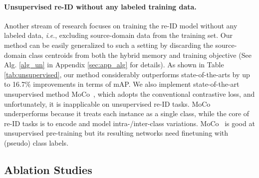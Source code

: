 \documentclass{article}
\newcommand{\ie}{\textit{i}.\textit{e}., }
\begin{document}
\paragraph{Unsupervised re-ID without any labeled training data.}

Another stream of research focuses on training the re-ID model without any labeled data, \ie excluding source-domain data from the training set.
Our method can be easily generalized to such a setting by discarding the source-domain class centroids  from both the hybrid memory and training objective (See Alg. \ref{alg_un} in Appendix \ref{sec:app_alg} for details).
As shown in Table \ref{tab:unsupervised}, our method considerably outperforms state-of-the-arts by up to 16.7\% improvements in terms of mAP.
We also implement state-of-the-art unsupervised method MoCo~\cite{he2019momentum}, which adopts the conventional contrastive loss, and unfortunately, it is inapplicable on unsupervised re-ID tasks.
MoCo~\cite{he2019momentum} underperforms because it treats each instance as a single class, while the core of re-ID tasks is to encode and model intra-/inter-class variations. MoCo~\cite{he2019momentum} is good at unsupervised pre-training but its resulting networks need finetuning with (pseudo) class labels.



\subsection{Ablation Studies}
\label{sec:ablation}
\vspace{-5pt}
\end{document}
